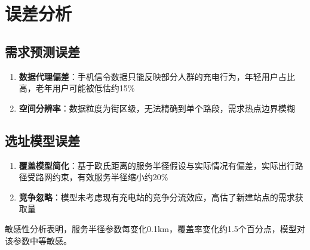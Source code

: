 \newpage
\section{误差分析}

\subsection{需求预测误差}
\begin{enumerate}
    \item[(1)] \textbf{数据代理偏差}：手机信令数据只能反映部分人群的充电行为，年轻用户占比高，老年用户可能被低估约15\%
    \item[(2)] \textbf{空间分辨率}：数据粒度为街区级，无法精确到单个路段，需求热点边界模糊
\end{enumerate}

\subsection{选址模型误差}
\begin{enumerate}
    \item[(1)] \textbf{覆盖模型简化}：基于欧氏距离的服务半径假设与实际情况有偏差，实际出行路径受路网约束，有效服务半径缩小约20\%
    \item[(2)] \textbf{竞争忽略}：模型未考虑现有充电站的竞争分流效应，高估了新建站点的需求获取量
\end{enumerate}
敏感性分析表明，服务半径参数每变化0.1km，覆盖率变化约1.5个百分点，模型对该参数中等敏感。